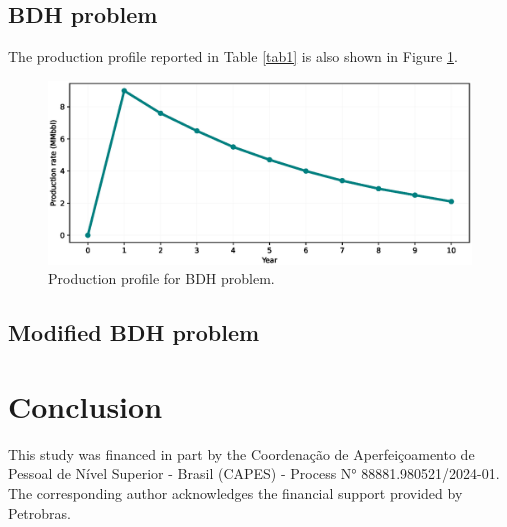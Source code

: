 \documentclass[pdflatex,sn-basic]{sn-jnl}%
\theoremstyle{thmstyleone}%
\theoremstyle{thmstyletwo}%
\theoremstyle{thmstylethree}%
\begin{document}
\subsection{BDH problem}\label{subsec51}

The production profile reported in Table \ref{tab1} is also shown in Figure \ref{fig15}.

\begin{figure}[H]
\centering
\begin{minipage}{0.95\textwidth}
  \includegraphics[width=\textwidth]{prod_profile.eps}
  \caption{Production profile for BDH problem.}
  \label{fig15}
\end{minipage}
\end{figure}

\subsection{Modified BDH problem}\label{subsec52}

\section{Conclusion}\label{sec6}



This study was financed in part by the Coordenação de Aperfeiçoamento de Pessoal de Nível Superior - Brasil (CAPES) - Process N° 88881.980521/2024-01. The corresponding author acknowledges the financial support provided by Petrobras.






\end{document}
